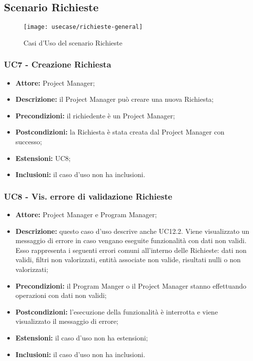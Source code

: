 \subsection{Scenario Richieste}
\begin{figure}[H] 
    \centering 
    \texttt{[image: usecase/richieste-general]} 
    \caption{Casi d'Uso del scenario Richieste}
\end{figure}

\subsubsection*{UC7 - Creazione Richiesta}
\begin{itemize}[label=$\circ$]
\item \textbf{Attore:} Project Manager;
\item \textbf{Descrizione:} il Project Manager può creare una nuova Richiesta;
\item \textbf{Precondizioni:} il richiedente è un Project Manager;
\item \textbf{Postcondizioni:} la Richiesta è stata creata dal Project Manager con successo;
\item \textbf{Estensioni:} UC8;
\item \textbf{Inclusioni:} il caso d'uso non ha inclusioni.
\end{itemize}

\subsubsection*{UC8 - Vis. errore di validazione Richieste}
\begin{itemize}[label=$\circ$]
\item \textbf{Attore:} Project Manager e Program Manager;
\item \textbf{Descrizione:}  questo caso d'uso descrive anche UC12.2. Viene visualizzato un messaggio di errore in caso vengano eseguite funzionalità con dati non validi. Esso rappresenta i seguenti errori comuni all'interno delle Richieste: dati non validi, filtri non valorizzati, entità associate non valide, risultati nulli o non valorizzati;
\item \textbf{Precondizioni:} il Program Manger o il Project Manager stanno effettuando operazioni con dati non validi;
\item \textbf{Postcondizioni:} l'esecuzione della funzionalità è interrotta e viene visualizzato il messaggio di errore;
\item \textbf{Estensioni:} il caso d'uso non ha estensioni;
\item \textbf{Inclusioni:} il caso d'uso non ha inclusioni.
\end{itemize}

